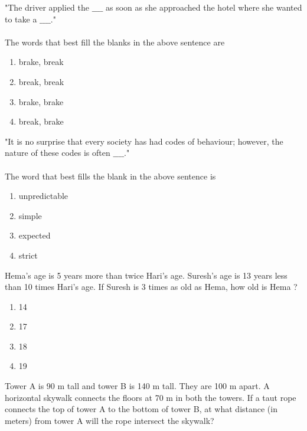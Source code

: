 \iffalse
\chapter{2018}
\author{AI24BTECH11009}
\section{ce}
\fi

\item "The driver applied the $\_\_\_\_$ as soon as she approached the hotel where she wanted to take a $\_\_\_\_$." \\\\
The words that best fill the blanks in the above sentence are
\begin{enumerate}
    \item brake, break
    \item break, break
    \item brake, brake
    \item break, brake \\
\end{enumerate}
\item "It is no surprise that every society has had codes of behaviour; however, the nature of these codes is often $\_\_\_\_$." \\\\
The word that best fills the blank in the above sentence is
\begin{enumerate}
    \item unpredictable
    \item simple
    \item expected
    \item strict \\
\end{enumerate}
\item Hema's age is 5 years more than twice Hari's age. Suresh's age is 13 years less than 10 times Hari's age. If Suresh is 3 times as old as Hema, how old is Hema ?
\begin{enumerate}
    \item 14
    \item 17
    \item 18
    \item 19 \\
\end{enumerate}
\item Tower A is 90 m tall and tower B is 140 m tall. They are 100 m apart. A horizontal skywalk connects the floors at 70 m in both the towers. If a taut rope connects the top of tower A to the bottom of tower B, at what distance (in meters) from tower A will the rope intersect the skywalk?
